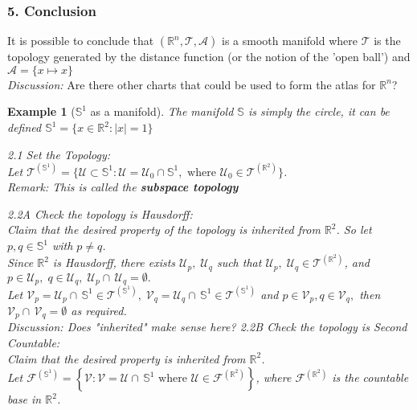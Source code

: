 \documentclass[11pt]{article}
\theoremstyle{thm}
\newtheorem{example}{Example}
\newcommand{\textem}[1]{\textcolor{mp}{\textbf{#1}}}
\newcommand{\bluetxt}[1]{\textcolor{mp}{#1}}
\newcommand{\vpi}[0]{\medskip \par \noindent}
\begin{document}
\subsubsection{5. Conclusion}
It is possible to conclude that $(\mathbb{R}^n, \mathcal{T}, \mathcal{A})$ is a smooth manifold where $\mathcal{T}$ is the topology generated by the distance function (or the notion of the 'open ball') and $\mathcal{A}=\{x \mapsto x \}$\\[1em]
\textit{Discussion:} Are there other charts that could be used to form the atlas for $\mathbb{R}^n$?
\newpage\noindent
\begin{example}[$\mathbb{S}^1$ as a manifold]
The manifold $\mathbb{S}$ is simply the circle, it can be defined $\mathbb{S}^1 = \{x \in \mathbb{R}^2: |x|=1 \}$\\
\vpi
\bluetxt{2.1 Set the Topology:}\\[1em]
Let $\mathcal{T}^{(\mathbb{S}^1)} = \{\mathcal{U} \subset \mathbb{S}^1: \mathcal{U}=\mathcal{U}_0 \cap \mathbb{S}^1,\text{ where } \mathcal{U}_0 \in \mathcal{T}^{(\mathbb{R}^2)} \}$.\\
\textit{Remark:} This is called the \textem{subspace topology}\\
\vpi
\bluetxt{2.2A Check the topology is Hausdorff:}\\[1em]
Claim that the desired property of the topology is inherited from $\mathbb{R}^2$. So let $p, q \in \mathbb{S}^1$ with $p \ne q$.\\[1em]
Since $\mathbb{R}^2$ is Hausdorff, there exists $\mathcal{U}_p,\; \mathcal{U}_q$ such that $\mathcal{U}_p,\;\mathcal{U}_q \in \mathcal{T}^{(\mathbb{R}^2)}$, and $p \in \mathcal{U}_p,\; q \in \mathcal{U}_q,\; \mathcal{U}_p\cap\,\mathcal{U}_q=\emptyset.$\\[1em]
Let $\mathcal{V}_p =\mathcal{U}_p\cap\,\mathbb{S}^1 \in \mathcal{T}^{(\mathbb{S}^1)},\; \mathcal{V}_q =\mathcal{U}_q\cap\,\mathbb{S}^1 \in \mathcal{T}^{(\mathbb{S}^1)}$ and $p\in \mathcal{V}_p, q\in \mathcal{V}_q,$ then $ \mathcal{V}_p \cap\,\mathcal{V}_q = \emptyset$ as required.\\[1em]
\textit{Discussion:} Does "inherited" make sense here?
\newpage \noindent
\bluetxt{2.2B Check the topology is Second Countable:}\\[1em]
Claim that the desired property is inherited from $\mathbb{R}^2$.\\[1em]
Let $\mathcal{F}^{(\mathbb{S}^1)}= \left\{\mathcal{V}: \mathcal{V} = \mathcal{U}\cap\,\mathbb{S}^1 \text{ where } \mathcal{U} \in \mathcal{F}^{(\mathbb{R}^2)} \right\}$, where $\mathcal{F}^{(\mathbb{R}^2)}$ is the countable base in $\mathbb{R}^2$.\\[1em]

\end{example}
\end{document}
